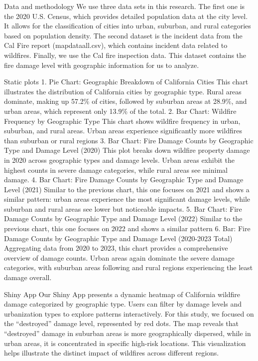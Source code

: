 \documentclass[
  letterpaper,
  DIV=11,
  numbers=noendperiod]{scrartcl}
\begin{document}
Data and methodology We use three data sets in this research. The first
one is the 2020 U.S. Census, which provides detailed population data at
the city level. It allows for the classification of cities into urban,
suburban, and rural categories based on population density. The second
dataset is the incident data from the Cal Fire report (mapdataall.csv),
which contains incident data related to wildfires. Finally, we use the
Cal fire inspection data. This dataset contains the fire damage level
with geographic information for us to analyze.

Static plots 1. Pie Chart: Geographic Breakdown of California Cities
This chart illustrates the distribution of California cities by
geographic type. Rural areas dominate, making up 57.2\% of cities,
followed by suburban areas at 28.9\%, and urban areas, which represent
only 13.9\% of the total. 2. Bar Chart: Wildfire Frequency by Geographic
Type This chart shows wildfire frequency in urban, suburban, and rural
areas. Urban areas experience significantly more wildfires than suburban
or rural regions 3. Bar Chart: Fire Damage Counts by Geographic Type and
Damage Level (2020) This plot breaks down wildfire property damage in
2020 across geographic types and damage levels. Urban areas exhibit the
highest counts in severe damage categories, while rural areas see
minimal damage. 4. Bar Chart: Fire Damage Counts by Geographic Type and
Damage Level (2021) Similar to the previous chart, this one focuses on
2021 and shows a similar pattern: urban areas experience the most
significant damage levels, while suburban and rural areas see lower but
noticeable impacts. 5. Bar Chart: Fire Damage Counts by Geographic Type
and Damage Level (2022) Similar to the previous chart, this one focuses
on 2022 and shows a similar pattern 6. Bar: Fire Damage Counts by
Geographic Type and Damage Level (2020-2023 Total) Aggregating data from
2020 to 2023, this chart provides a comprehensive overview of damage
counts. Urban areas again dominate the severe damage categories, with
suburban areas following and rural regions experiencing the least damage
overall.

Shiny App Our Shiny App presents a dynamic heatmap of California
wildfire damage categorized by geographic type. Users can filter by
damage levels and urbanization types to explore patterns interactively.
For this study, we focused on the ``destroyed'' damage level,
represented by red dots. The map reveals that ``destroyed'' damage in
suburban areas is more geographically dispersed, while in urban areas,
it is concentrated in specific high-risk locations. This visualization
helps illustrate the distinct impact of wildfires across different
regions.
\end{document}
